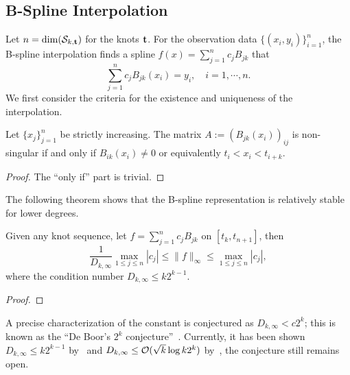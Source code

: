 \subsection{B-Spline Interpolation}
\label{SSec: 2-B-SPL-INT}
Let $n = \dim(\mathcal S_{k, \mathbf t})$ for the knots $\mathbf t$. For the observation data $\{(x_i, y_i)\}_{i=1}^n$, the B-spline interpolation finds a spline $f(x) = \sum_{j=1}^n c_j B_{jk}$ that 
\begin{equation}
    \sum_{j=1}^n c_j B_{jk}(x_i) = y_i, \quad i = 1,\cdots, n.
\end{equation}
We first consider the criteria for the existence and uniqueness of the interpolation.
\begin{theorem}
Let $\{x_j\}_{j=1}^n$ be strictly increasing. The matrix $A:= (B_{jk}(x_i))_{ij}$ is non-singular if and only if $B_{ik}(x_i) \neq 0$ or equivalently $t_i < x_i < t_{i+k}$.
\end{theorem}
\begin{proof}
    The ``only if'' part is trivial.
\end{proof}
The following theorem shows that the B-spline representation is relatively stable for lower degrees. 
\begin{theorem}
    \label{Thm: 2-B-SPL-GOO-CON}
    Given any knot sequence, let $f = \sum_{j=1}^n c_j B_{jk}$ on $[t_k, t_{n+1}]$, then 
    \begin{equation}
        \frac{1}{D_{k,\infty}} \max_{1\le j\le n} |c_j| \le \|f\|_{\infty} \le \max_{1\le j \le n} |c_{j}|,
    \end{equation}
    where the condition number $D_{k,\infty} \le k 2^{k - 1}$. 
\end{theorem}
\begin{proof}
    
\end{proof}
A precise characterization of the constant is conjectured as $D_{k,\infty} < c 2^{k}$; this is known as the ``De Boor's $2^k$ conjecture''~\cite{de1990exact}. Currently, it has been shown $D_{k,\infty} \le k 2^{k-1}$ by~\cite{scherer1999new} and $D_{k,\infty} \le \mathcal O(\sqrt{k}\log k 2^{k})$ by~\cite{zhong2026improvement}, the conjecture still remains open.






